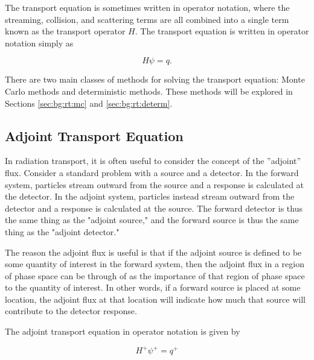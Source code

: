 
The transport equation is sometimes written in operator notation, where the streaming, collision, and scattering terms are all combined into a single term known as the transport operator $H$.
The transport equation is written in operator notation simply as

\begin{equation}\label{eq:bg:rt:transport-operator}
  H\psi = q.
\end{equation}

There are two main classes of methods for solving the transport equation: Monte Carlo methods and deterministic methods.
These methods will be explored in Sections \ref{sec:bg:rt:mc} and \ref{sec:bg:rt:determ}.

\subsection{Adjoint Transport Equation}
\label{sec:bg:rt:adjoint}

In radiation transport, it is often useful to consider the concept of the ''adjoint'' flux.
Consider a standard problem with a source and a detector.
In the forward system, particles stream outward from the source and a response is calculated at the detector.
In the adjoint system, particles instead stream outward from the detector and a response is calculated at the source.
The forward detector is thus the same thing as the "adjoint source," and the forward source is thus the same thing as the "adjoint detector."

The reason the adjoint flux is useful is that if the adjoint source is defined to be some quantity of interest in the forward system, then the adjoint flux in a region of phase space can be through of as the importance of that region of phase space to the quantity of interest.
In other words, if a forward source is placed at some location, the adjoint flux at that location will indicate how much that source will contribute to the detector response.

The adjoint transport equation in operator notation is given by

\begin{equation}\label{eq:bg:rt:adjoint-transport-operator}
  H^+\psi^+ = q^+
\end{equation}

